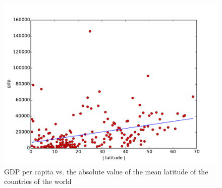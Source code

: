 \documentclass{article}
\begin{document}
\begin{figure}[h]
\centering
\includegraphics[scale=0.5]{scatter.pdf}
\caption{GDP per capita vs. the absolute value of the mean latitude of the countries of the world}
\label{fig:fig1}
\end{figure}



\end{document}
